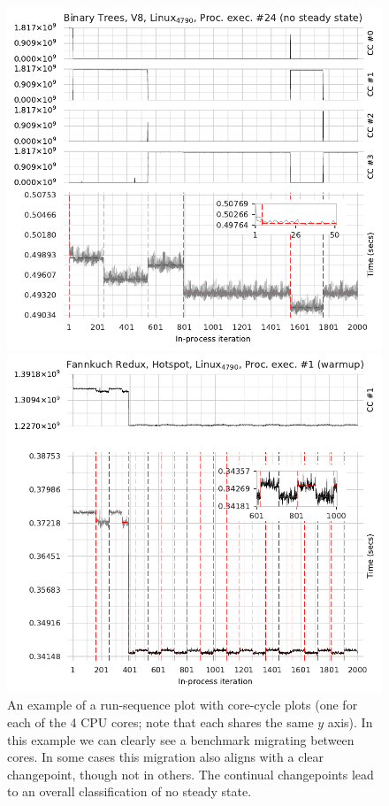 \documentclass[acmlarge]{acmart}\settopmatter{printfolios=true}
\begin{document}
\begin{figure}[t]
\centering
\begin{minipage}[t]{0.485\textwidth}
\includegraphics[width=\textwidth]{examples/new_no_steady.pdf}
\caption{An example of a run-sequence plot with core-cycle plots (one
for each of the 4 CPU cores; note that each shares the same $y$ axis). In this
example we can clearly see a benchmark migrating between cores. In some
cases this migration also aligns with a clear changepoint, though not
in others. The continual changepoints lead to an overall classification
of no steady state.}
\label{fig:examples:nosteadystate}
\end{minipage}%
\hfill%
\begin{minipage}[t]{0.485\textwidth}
\includegraphics[width=\textwidth]{examples/new_cyclic.pdf}

\end{minipage}
\end{figure}
\end{document}
